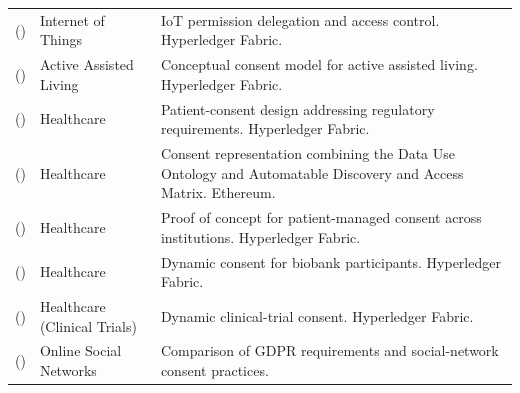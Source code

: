 \begin{longtable}{@{}>{\raggedright\arraybackslash}m{}>{\raggedright\arraybackslash}m{}>{\raggedright\arraybackslash}m{}@{}}
\addlinespace[5pt]
\cite{2019-blockchain-permission-iot} (\citeyear{2019-blockchain-permission-iot}) & Internet of Things & IoT permission delegation and access control. Hyperledger Fabric. \\
\addlinespace[5pt]
\cite{2020-blockchain-assisted-living} (\citeyear{2020-blockchain-assisted-living}) & Active Assisted Living & Conceptual consent model for active assisted living. Hyperledger Fabric. \\
\addlinespace[5pt]
\cite{2020-consent-design-bc-based-consent-manag} (\citeyear{2020-consent-design-bc-based-consent-manag}) & Healthcare & Patient-consent design addressing regulatory requirements. Hyperledger Fabric. \\
\addlinespace[5pt]
\cite{2020-consent-health} (\citeyear{2020-consent-health}) & Healthcare & Consent representation combining the Data Use Ontology and Automatable Discovery and Access Matrix. Ethereum. \\
\addlinespace[5pt]
\cite{2020-patient-consent-e-health} (\citeyear{2020-patient-consent-e-health}) & Healthcare & Proof of concept for patient-managed consent across institutions. Hyperledger Fabric. \\
\addlinespace[5pt]
\cite{2020-consent-biobanking} (\citeyear{2020-consent-biobanking}) & Healthcare & Dynamic consent for biobank participants. Hyperledger Fabric. \\
\addlinespace[5pt]
\cite{2020-consent-clinical-trials} (\citeyear{2020-consent-clinical-trials}) & Healthcare (Clinical Trials) & Dynamic clinical-trial consent. Hyperledger Fabric. \\
\addlinespace[5pt]
\cite{10.1109/ICICT50521.2020.00054} (\citeyear{10.1109/ICICT50521.2020.00054}) & Online Social Networks & Comparison of GDPR requirements and social-network consent practices. \\
\end{longtable}
\endgroup

